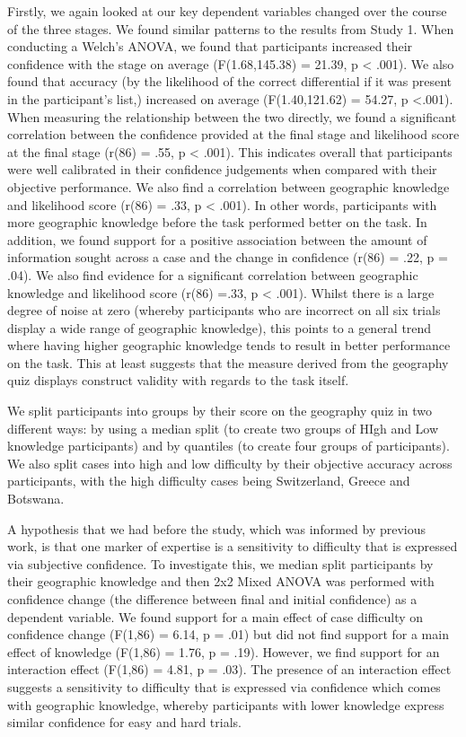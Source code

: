 \documentclass[a4paper, nobind]{templates/ociamthesis}
\begin{document}
Firstly, we again looked at our key dependent variables changed over the course of the three stages. We found similar patterns to the results from Study 1. When conducting a Welch's ANOVA, we found that participants increased their confidence with the stage on average (F(1.68,145.38) = 21.39, p \textless{} .001). We also found that accuracy (by the likelihood of the correct differential if it was present in the participant's list,) increased on average (F(1.40,121.62) = 54.27, p \textless.001). When measuring the relationship between the two directly, we found a significant correlation between the confidence provided at the final stage and likelihood score at the final stage (r(86) = .55, p \textless{} .001). This indicates overall that participants were well calibrated in their confidence judgements when compared with their objective performance. We also find a correlation between geographic knowledge and likelihood score (r(86) = .33, p \textless{} .001). In other words, participants with more geographic knowledge before the task performed better on the task. In addition, we found support for a positive association between the amount of information sought across a case and the change in confidence (r(86) = .22, p = .04). We also find evidence for a significant correlation between geographic knowledge and likelihood score (r(86) =.33, p \textless{} .001). Whilst there is a large degree of noise at zero (whereby participants who are incorrect on all six trials display a wide range of geographic knowledge), this points to a general trend where having higher geographic knowledge tends to result in better performance on the task. This at least suggests that the measure derived from the geography quiz displays construct validity with regards to the task itself.

We split participants into groups by their score on the geography quiz in two different ways: by using a median split (to create two groups of HIgh and Low knowledge participants) and by quantiles (to create four groups of participants). We also split cases into high and low difficulty by their objective accuracy across participants, with the high difficulty cases being Switzerland, Greece and Botswana.

A hypothesis that we had before the study, which was informed by previous work, is that one marker of expertise is a sensitivity to difficulty that is expressed via subjective confidence. To investigate this, we median split participants by their geographic knowledge and then 2x2 Mixed ANOVA was performed with confidence change (the difference between final and initial confidence) as a dependent variable. We found support for a main effect of case difficulty on confidence change (F(1,86) = 6.14, p = .01) but did not find support for a main effect of knowledge (F(1,86) = 1.76, p = .19). However, we find support for an interaction effect (F(1,86) = 4.81, p = .03). The presence of an interaction effect suggests a sensitivity to difficulty that is expressed via confidence which comes with geographic knowledge, whereby participants with lower knowledge express similar confidence for easy and hard trials.
\end{document}
